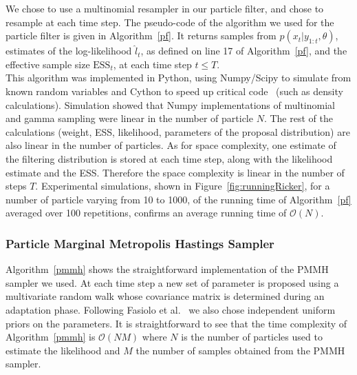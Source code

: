 \documentclass[12pt]{article}
\begin{document}
	We chose to use a multinomial resampler in our particle filter, and chose to resample at each time step. The pseudo-code of the algorithm we used for the particle filter is given in Algorithm~\ref{pf}. It returns samples from $p(x_t | y_{1:t}, \theta)$, estimates of the log-likelihood $\hat{l}_t$, as defined on line 17 of Algorithm~\ref{pf}, and the effective sample size $\mathrm{ESS}_t$, at each time step $t \le T$. \\
	This algorithm was implemented in Python, using Numpy/Scipy to simulate from known random variables and Cython to speed up critical code~\cite{wilbers2009using, behnel2011cython} (such as density calculations). Simulation showed that Numpy implementations of multinomial and gamma sampling were linear in the number of particle $N$. The rest of the calculations (weight, ESS, likelihood, parameters of the proposal distribution) are also linear in the number of particles. As for space complexity, one estimate of the filtering distribution is stored at each time step, along with the likelihood estimate and the ESS. Therefore the space complexity is linear in the number of steps $T$. Experimental simulations, shown in Figure~\ref{fig:runningRicker}, for a number of particle varying from 10 to 1000, of the running time of Algorithm~\ref{pf} averaged over 100 repetitions, confirms an average running time of $\mathcal{O}(N)$.
	
	\subsubsection{Particle Marginal Metropolis Hastings Sampler}
	Algorithm~\ref{pmmh} shows the straightforward implementation of the PMMH sampler we used. At each time step a new set of parameter is proposed using a multivariate random walk whose covariance matrix is determined during an adaptation phase. Following Fasiolo et al.~\cite{fasiolo2014statistical} we also chose independent uniform priors on the parameters. It is straightforward to see that the time complexity of Algorithm~\ref{pmmh} is $\mathcal{O}(NM)$ where $N$ is the number of particles used to estimate the likelihood and $M$ the number of samples obtained from the PMMH sampler.
	
\end{document}
